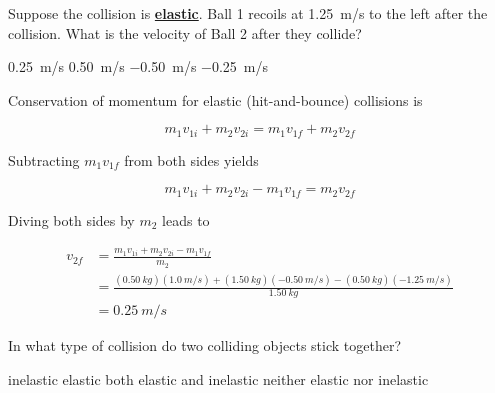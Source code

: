 \documentclass[]{exam}
\begin{document}
\begin{questions}
\begin{center}
\end{center}

Suppose the collision is \textbf{\underline{elastic}}. Ball 1 recoils at \SI{1.25}{m/s} to the left after the collision. What is the velocity of Ball 2 after they collide?

\begin{randomizechoices}
    \correctchoice \SI{0.25}{m/s}
    \choice \SI{0.50}{m/s}
    \choice \SI{-0.50}{m/s}
    \choice \SI{-0.25}{m/s}
\end{randomizechoices}

\begin{solution}
Conservation of momentum for elastic (hit-and-bounce) collisions is

\begin{equation*}
    m_1 v_{1i} + m_2 v_{2i} = m_1 v_{1f} + m_2 v_{2f}
\end{equation*}

Subtracting $m_1 v_{1f}$ from both sides yields

\begin{equation*}
    m_1 v_{1i} + m_2 v_{2i}  - m_1 v_{1f} = m_2 v_{2f}
\end{equation*}

Diving both sides by $m_2$ leads to

\begin{align*}
    v_{2f} &= \frac{m_1 v_{1i} + m_2 v_{2i}  - m_1 v_{1f}}{m_2} \\[1ex]
    & = \frac{(\SI{0.50}{kg})(\SI{1.0}{m/s}) + (\SI{1.50}{kg})(-\SI{0.50}{m/s}) - (\SI{0.50}{kg})(\SI{-1.25}{m/s})}{\SI{1.50}{kg}} \\[1ex]
    &= \boxed{\SI{0.25}{m/s}}
\end{align*}
\end{solution}

\question
In what type of collision do two colliding objects stick together?

\begin{randomizechoices}
    \correctchoice inelastic
    \choice elastic
    \choice both elastic and inelastic
    \choice neither elastic nor inelastic
\end{randomizechoices}







\end{questions}
\end{document}

